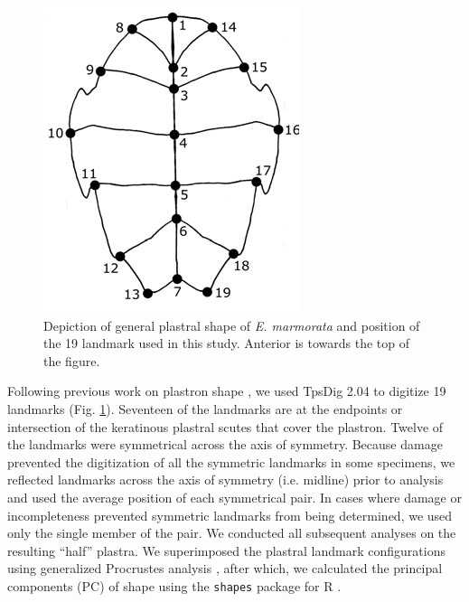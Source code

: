 \documentclass[12pt,letterpaper]{article}
\begin{document}
\begin{figure}[h]
  \centering
  \includegraphics[height = 0.5\textheight, width = \textwidth, keepaspectratio = true]{figure/plastra}
  \caption{Depiction of general plastral shape of \textit{E. marmorata} and position of the 19 landmark used in this study. Anterior is towards the top of the figure.}
  \label{fig:plastra}
\end{figure}


Following previous work on plastron shape \citep{Angielczyk2007,Angielczyk2011,Angielczyk2013a}, we used TpsDig 2.04 \citep{Rohlf2005} to digitize 19 landmarks (Fig. \ref{fig:plastra}). Seventeen of the landmarks are at the endpoints or intersection of the keratinous plastral scutes that cover the plastron. Twelve of the landmarks were symmetrical across the axis of symmetry. Because damage prevented the digitization of all the symmetric landmarks in some specimens, we reflected landmarks across the axis of symmetry (i.e. midline) prior to analysis and used the average position of each symmetrical pair. In cases where damage or incompleteness prevented symmetric landmarks from being determined, we used only the single member of the pair. We conducted all subsequent analyses on the resulting ``half'' plastra. We superimposed the plastral landmark configurations using generalized Procrustes analysis \citep{Dryden1998a}, after which, we calculated the principal components (PC) of shape using the \texttt{shapes} package for R \citep{R2016,Dryden2013}.
\end{document}
